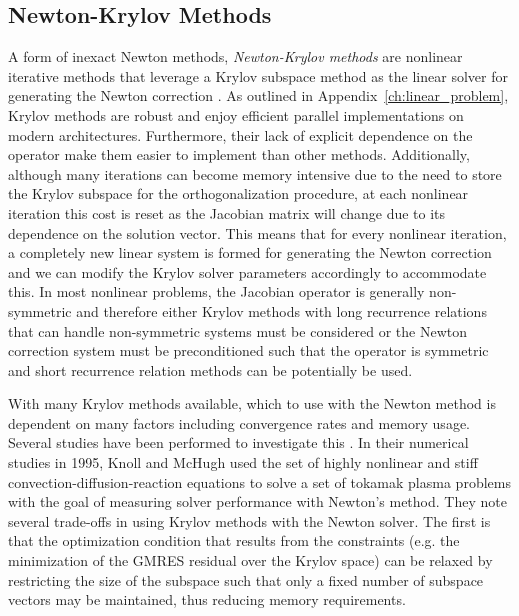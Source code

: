\subsection{Newton-Krylov Methods\ }
\label{subsec:newton_krylov_methods}
A form of inexact Newton methods, \textit{Newton-Krylov methods} are
nonlinear iterative methods that leverage a Krylov subspace method as
the linear solver for generating the Newton correction
\cite{kelley_iterative_1995}. As outlined in
Appendix~\ref{ch:linear_problem}, Krylov methods are robust and enjoy
efficient parallel implementations on modern
architectures. Furthermore, their lack of explicit dependence on the
operator make them easier to implement than other
methods. Additionally, although many iterations can become memory
intensive due to the need to store the Krylov subspace for the
orthogonalization procedure, at each nonlinear iteration this cost is
reset as the Jacobian matrix will change due to its dependence on the
solution vector. This means that for every nonlinear iteration, a
completely new linear system is formed for generating the Newton
correction and we can modify the Krylov solver parameters accordingly
to accommodate this. In most nonlinear problems, the Jacobian operator
is generally non-symmetric and therefore either Krylov methods with
long recurrence relations that can handle non-symmetric systems must
be considered or the Newton correction system must be preconditioned
such that the operator is symmetric and short recurrence relation
methods can be potentially be used.

With many Krylov methods available, which to use with the Newton
method is dependent on many factors including convergence rates and
memory usage. Several studies have been performed to investigate this
\cite{mchugh_inexact_1993,knoll_newton-krylov_1995}. In their
numerical studies in 1995, Knoll and McHugh used the set of highly
nonlinear and stiff convection-diffusion-reaction equations to solve a
set of tokamak plasma problems with the goal of measuring solver
performance with Newton's method. They note several trade-offs in
using Krylov methods with the Newton solver. The first is that the
optimization condition that results from the constraints (e.g. the
minimization of the GMRES residual over the Krylov space) can be
relaxed by restricting the size of the subspace such that only a fixed
number of subspace vectors may be maintained, thus reducing memory
requirements. 

